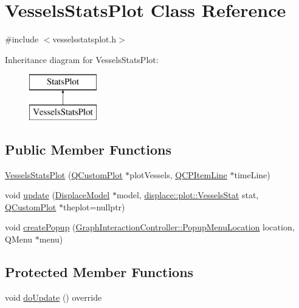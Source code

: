 \hypertarget{class_vessels_stats_plot}{}\section{Vessels\+Stats\+Plot Class Reference}
\label{class_vessels_stats_plot}


{\ttfamily \#include $<$vesselsstatsplot.\+h$>$}

Inheritance diagram for Vessels\+Stats\+Plot\+:\begin{figure}[H]
\begin{center}
\leavevmode
\includegraphics[height=2.000000cm]{de/db2/class_vessels_stats_plot}
\end{center}
\end{figure}
\subsection*{Public Member Functions}
\begin{DoxyCompactItemize}
\item 
\mbox{\hyperlink{class_vessels_stats_plot_ab6f1ed73ddc87f2558cf7ec70f9f4562}{Vessels\+Stats\+Plot}} (\mbox{\hyperlink{class_q_custom_plot}{Q\+Custom\+Plot}} $\ast$plot\+Vessels, \mbox{\hyperlink{class_q_c_p_item_line}{Q\+C\+P\+Item\+Line}} $\ast$time\+Line)
\item 
void \mbox{\hyperlink{class_vessels_stats_plot_ade75c576e88d4092031e7bebc55bd5f9}{update}} (\mbox{\hyperlink{class_displace_model}{Displace\+Model}} $\ast$model, \mbox{\hyperlink{namespacedisplace_1_1plot_aa453098d286017edd5b0ff3f15ba1013}{displace\+::plot\+::\+Vessels\+Stat}} stat, \mbox{\hyperlink{class_q_custom_plot}{Q\+Custom\+Plot}} $\ast$theplot=nullptr)
\item 
void \mbox{\hyperlink{class_vessels_stats_plot_a0362431ae0205351ab2b1ee85520bac1}{create\+Popup}} (\mbox{\hyperlink{class_graph_interaction_controller_a67e6eba082927bf2b984bed54fe32764}{Graph\+Interaction\+Controller\+::\+Popup\+Menu\+Location}} location, Q\+Menu $\ast$menu)
\end{DoxyCompactItemize}
\subsection*{Protected Member Functions}
\begin{DoxyCompactItemize}
\item 
void \mbox{\hyperlink{class_vessels_stats_plot_a1886250b73f089bd1aca425d7323d743}{do\+Update}} () override
\end{DoxyCompactItemize}


